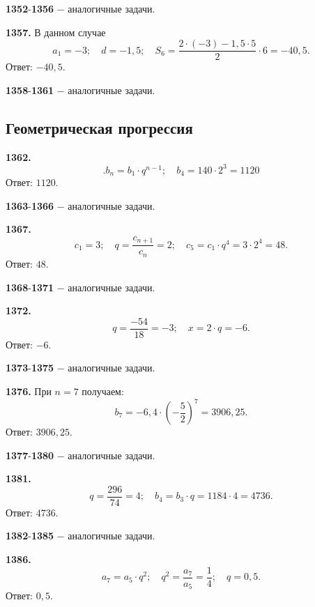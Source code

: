 \textbf{1352}-\textbf{1356} $-$ аналогичные задачи.

\textbf{1357.} В данном случае $$a_1=-3;\quad d=-1,5;\quad S_6=\frac{2\cdot(-3)-1,5\cdot5}{2}\cdot6=-40,5.$$ \newline \null \hspace*{\fill} Ответ: $-40,5$.

\textbf{1358}-\textbf{1361} $-$ аналогичные задачи.

\subsection{Геометрическая прогрессия}


\textbf{1362.} $$.b_n=b_1\cdot q^{n-1};\quad b_4=140\cdot2^3=1120$$ \newline \null \hspace*{\fill} Ответ: $1120$.

\textbf{1363}-\textbf{1366} $-$ аналогичные задачи.

\textbf{1367.} $$c_1=3;\quad q=\frac{c_{n+1}}{c_n}=2;\quad c_5=c_1\cdot q^4=3\cdot2^4=48.$$ \newline \null \hspace*{\fill} Ответ: $48$. 

\textbf{1368}-\textbf{1371} $-$ аналогичные задачи.   

\textbf{1372.} $$q=\frac{-54}{18}=-3;\quad x=2\cdot q=-6.$$ \newline \null \hspace*{\fill} Ответ: $-6$.

\textbf{1373}-\textbf{1375} $-$ аналогичные задачи.

\textbf{1376.} При $n=7$ получаем: $$b_7=-6,4\cdot\left(-\frac{5}{2}\right)^7=3906,25.$$ \newline \null \hspace*{\fill} Ответ: $3906,25$.

\textbf{1377}-\textbf{1380} $-$ аналогичные задачи.

\textbf{1381.} $$q=\frac{296}{74}=4;\quad b_4=b_3\cdot q=1184\cdot4=4736.$$ \newline \null \hspace*{\fill} Ответ: $4736$.

\textbf{1382}-\textbf{1385} $-$ аналогичные задачи.

\textbf{1386.} $$a_7=a_5\cdot q^2;\quad q^2=\frac{a_7}{a_5}=\frac{1}{4};\quad q=0,5.$$ \newline \null \hspace*{\fill} Ответ: $0,5$.

